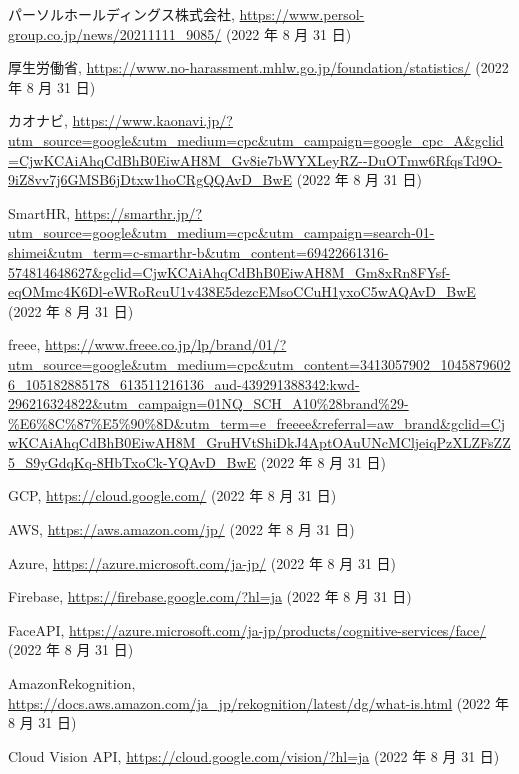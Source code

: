 \documentclass[12pt]{ltjsreport}%
\begin{document}
\begin{thebibliography}{99}

パーソルホールディングス株式会社,
\url{https://www.persol-group.co.jp/news/20211111_9085/} (2022 年 8 月 31 日)

厚生労働省,
\url{https://www.no-harassment.mhlw.go.jp/foundation/statistics/} (2022 年 8 月 31 日)

カオナビ,
\url{https://www.kaonavi.jp/?utm_source=google&utm_medium=cpc&utm_campaign=google_cpc_A&gclid=CjwKCAiAhqCdBhB0EiwAH8M_Gv8ie7bWYXLeyRZ--DuOTmw6RfqsTd9O-9iZ8vv7j6GMSB6jDtxw1hoCRgQQAvD_BwE} (2022 年 8 月 31 日)

SmartHR,
\url{https://smarthr.jp/?utm_source=google&utm_medium=cpc&utm_campaign=search-01-shimei&utm_term=c-smarthr-b&utm_content=69422661316-574814648627&gclid=CjwKCAiAhqCdBhB0EiwAH8M_Gm8xRn8FYsf-eqOMmc4K6Dl-eWRoRcuU1v438E5dezcEMsoCCuH1yxoC5wAQAvD_BwE} (2022 年 8 月 31 日)

freee,
\url{https://www.freee.co.jp/lp/brand/01/?utm_source=google&utm_medium=cpc&utm_content=3413057902_10458796026_105182885178_613511216136_aud-439291388342:kwd-296216324822&utm_campaign=01NQ_SCH_A10%28brand%29-%E6%8C%87%E5%90%8D&utm_term=e_freeee&referral=aw_brand&gclid=CjwKCAiAhqCdBhB0EiwAH8M_GruHVtShiDkJ4AptOAuUNcMCljeiqPzXLZFsZZ5_S9yGdqKq-8HbTxoCk-YQAvD_BwE} (2022 年 8 月 31 日)

GCP,
\url{https://cloud.google.com/} (2022 年 8 月 31 日)

AWS,
\url{https://aws.amazon.com/jp/} (2022 年 8 月 31 日)

Azure,
\url{https://azure.microsoft.com/ja-jp/} (2022 年 8 月 31 日)

Firebase,
\url{https://firebase.google.com/?hl=ja} (2022 年 8 月 31 日)

Face\hspace{3pt}API,
\url{https://azure.microsoft.com/ja-jp/products/cognitive-services/face/} (2022 年 8 月 31 日)

Amazon\hspace{3pt}Rekognition,
\url{https://docs.aws.amazon.com/ja_jp/rekognition/latest/dg/what-is.html} (2022 年 8 月 31 日)

Cloud Vision API,
\url{https://cloud.google.com/vision/?hl=ja} (2022 年 8 月 31 日)


\end{thebibliography}
\end{document}
